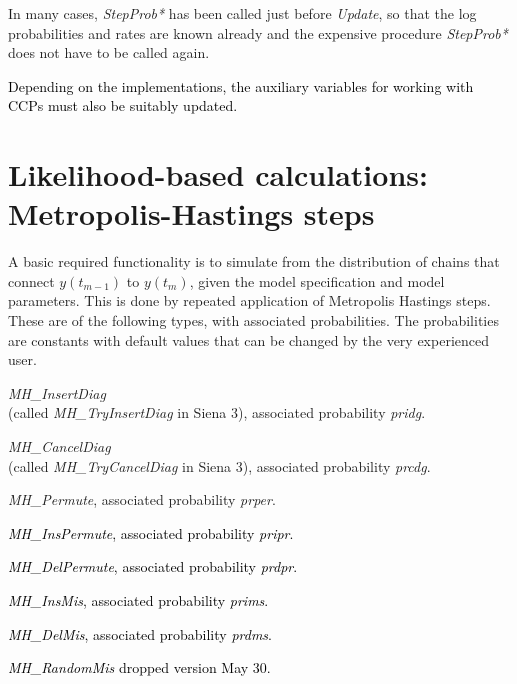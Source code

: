 \documentclass[a4paper,12pt,fleqn]{article}
\newcommand{\adda}[1]{{#1}}  %
\newcommand{\addaa}[1]{{\textcolor[named]{Black}{#1}}}  %
\newcommand{\addcf}[1]{{\textcolor[named]{Black}{#1}}}
\begin{document}
\adda{In many cases, \textit{StepProb*} has been called just before \textit{Update},
so that the log probabilities and rates are known already and
the expensive procedure \textit{StepProb*} does not have to be called again.}

\addaa{Depending on the implementations, the auxiliary variables for working with CCPs
must also be suitably updated.}

\section{Likelihood-based calculations:
         \protect\newline Metropolis-Hastings steps}

A basic required functionality is to simulate from the distribution
of chains that connect $y(t_{m-1})$ to $y(t_m)$,
given the model specification and model parameters.
This is done by repeated application of Metropolis Hastings steps.
These are of the following types, with associated probabilities.
The probabilities are constants with default values that can be changed
by the very experienced user.
\begin{enumerate}
\item \textit{MH\_InsertDiag}\\
      (called \textit{MH\_TryInsertDiag} in Siena 3), associated probability \textit{pridg}.
\item \textit{MH\_CancelDiag}\\
      (called \textit{MH\_TryCancelDiag} in Siena 3), associated probability \textit{prcdg}.
\item \textit{MH\_Permute}, associated probability \textit{prper}.
\addaa{
\item \textit{MH\_InsPermute}, associated probability \textit{pripr}.
\item \textit{MH\_DelPermute}, associated probability \textit{prdpr}.
}
\addcf{
\item \textit{MH\_InsMis}, associated probability \textit{prims}.
\item \textit{MH\_DelMis}, associated probability \textit{prdms}.
\item \textit{MH\_RandomMis} dropped version May 30.
}
\end{enumerate}
\end{document}

